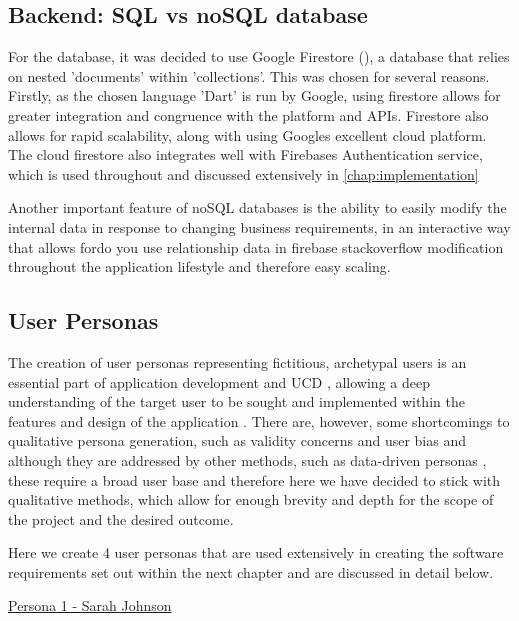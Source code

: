\documentclass[12pt]{article}
\begin{document}
	\subsection{Backend: SQL vs noSQL database}
	For the database, it was decided to use Google Firestore (\cite{CloudFirestoreFirebase}), a  database that relies on  nested 'documents' within 'collections'. This was chosen for several reasons. Firstly, as the chosen language 'Dart' is run by Google, using firestore allows for greater integration and congruence with the platform and APIs. Firestore also allows for rapid scalability, along with using Googles excellent cloud platform. The cloud firestore also integrates well with Firebases Authentication service, which is used throughout and discussed extensively in \autoref{chap:implementation}
	
	Another important feature of noSQL databases is the ability to easily modify the internal data in response to changing business requirements, in an interactive way that allows fordo you use relationship data in firebase stackoverflow modification throughout the application lifestyle and therefore easy scaling.

	\subsection{User Personas}
	\label{user-personas}
	The creation of user personas representing fictitious, archetypal users is an essential part of application development and UCD \cite{PDFPersonasParticipatory}, allowing a deep understanding of the target user to be sought and implemented within the features and design of the application \cite{arnowitzChapter15Wireframe2007}. There are, however, some shortcomings to qualitative persona generation, such as validity concerns and user bias \cite{chapmanPersonasNewClothes2005} and although they are addressed by other methods, such as data-driven personas \cite{mcginnDatadrivenPersonaDevelopment2008}, these require a broad user base and therefore here we have decided to stick with qualitative methods, which allow for enough brevity and depth for the scope of the project and the desired outcome.
	
	Here we create 4 user personas that are used extensively in creating the software requirements set out within the next chapter and are discussed in detail below.
	\newline
	
		\underline{Persona 1 - Sarah Johnson}
		
\end{document}

